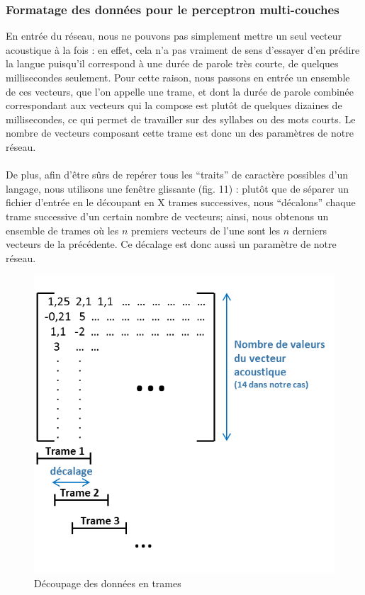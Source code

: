\documentclass{article}
\begin{document}
\subsubsection{Formatage des données pour le perceptron multi-couches}

En entrée du réseau, nous ne pouvons pas simplement mettre un seul vecteur acoustique à la fois : en effet, cela n'a pas vraiment de sens d'essayer d'en prédire la langue puisqu'il correspond à une durée de parole très courte, de quelques millisecondes seulement. Pour cette raison, nous passons en entrée un ensemble de ces vecteurs, que l'on appelle une trame, et dont la durée de parole combinée correspondant aux vecteurs qui la compose est plutôt de quelques dizaines de millisecondes, ce qui permet de travailler sur des syllabes ou des mots courts. Le nombre de vecteurs composant cette trame est donc un des paramètres de notre réseau.\\
 \\
De plus, afin d'être sûrs de repérer tous les ``traits'' de caractère possibles d'un langage, nous utilisons une fenêtre glissante (fig. 11) : plutôt que de séparer un fichier d'entrée en le découpant en X trames successives, nous ``décalons'' chaque trame successive d'un certain nombre de vecteurs; ainsi, nous obtenons un ensemble de trames où les $n$ premiers vecteurs de l'une sont les $n$ derniers vecteurs de la précédente. Ce décalage est donc aussi un paramètre de notre réseau.

\hphantom{.}
\begin{figure}[h]
  \centerline{\includegraphics[scale=0.7]{img/schema_decoupage_trame.png}}
  \caption{Découpage des données en trames}
\end{figure}
\end{document}
